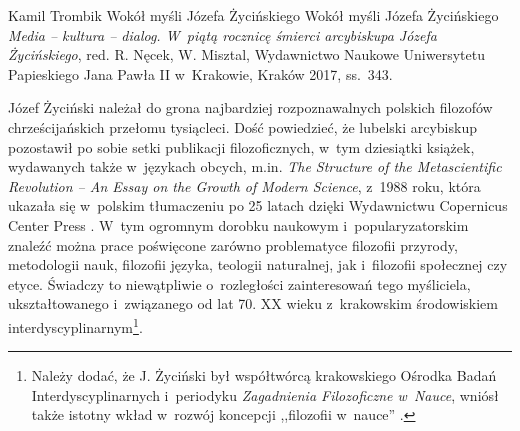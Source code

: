 \begin{recplenv}{Kamil Trombik}
	{Wokół myśli Józefa Życińskiego}
	{Wokół myśli Józefa Życińskiego}
	{\textit{Media -- kultura -- dialog. W~piątą rocznicę śmierci arcybiskupa Józefa Życińskiego}, red. R. Nęcek, W. Misztal, Wydawnictwo Naukowe Uniwersytetu Papieskiego Jana Pawła II w~Krakowie, Kraków 2017, ss.~343.}







Józef Życiński należał do grona najbardziej rozpoznawalnych polskich filozofów chrześcijańskich przełomu tysiącleci. Dość powiedzieć, że lubelski arcybiskup pozostawił po sobie setki publikacji filozoficznych, w~tym dziesiątki książek, wydawanych także w~językach obcych, m.in. \textit{The Structure of the Metascientific Revolution -- An Essay on the Growth of Modern Science}, z~1988 roku, która ukazała się w~polskim tłumaczeniu po 25 latach dzięki Wydawnictwu Copernicus Center Press
\parencite[][]{zycinski_struktura_2013}.%
 W~tym ogromnym dorobku naukowym i~popularyzatorskim znaleźć można prace poświęcone zarówno problematyce filozofii przyrody, metodologii nauk, filozofii języka, teologii naturalnej, jak i~filozofii społecznej czy etyce. Świadczy to niewątpliwie o~rozległości zainteresowań tego myśliciela, ukształtowanego i~związanego od lat 70. XX wieku z~krakowskim środowiskiem interdyscyplinarnym\footnote{Należy dodać, że J. Życiński był współtwórcą krakowskiego Ośrodka Badań Interdyscyplinarnych i~periodyku \textit{Zagadnienia Filozoficzne w~Nauce}, wniósł także istotny wkład w~rozwój koncepcji ,,filozofii w~nauce'' 
\parencite[zob. np.][]{polak_philosophy_2019}.%
}.


\end{recplenv}
